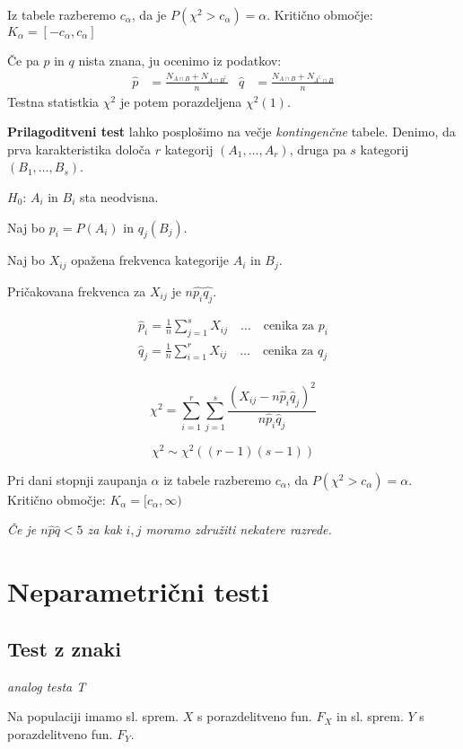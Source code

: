 \begin{multicols}{5}
Iz tabele razberemo $c_\alpha$, da je $P(\chi^2 > c_\alpha) = \alpha$. Kritično območje: $K_\alpha = [-c_\alpha, c_\alpha]$

Če pa $p$ in $q$ nista znana, ju ocenimo iz podatkov:
\begin{align*}
    \hat{p} &= \frac{N_{A\cap B} + N_{A \cap B^\complement}}{n} &
    \hat{q} &= \frac{N_{A\cap B} + N_{A^\complement \cap B}}{n}
\end{align*}
Testna statistkia $\chi^2$ je potem porazdeljena $\chi^2(1)$.

\textbf{Prilagoditveni test} lahko posplošimo na večje \textit{kontingenčne} tabele. 
Denimo, da prva karakteristika določa $r$ kategorij $(A_1, \dots, A_r)$, druga pa $s$ kategorij $(B_1, \dots, B_s)$.

$H_0$: $A_i$ in $B_i$ sta neodvisna.

Naj bo $p_i = P(A_i)$ in $q_j(B_j)$.

Naj bo $X_{ij}$ opažena frekvenca kategorije $A_i$ in $B_j$.

Pričakovana frekvenca za $X_{ij}$ je $n\hat{p_i} \hat{q_j}$.

\begin{align*}
    \hat{p}_i = \frac{1}{n} \sum_{j=1}^s X_{ij} \quad \dots \quad \text{cenika za } p_i \\
    \hat{q}_j = \frac{1}{n} \sum_{i=1}^r X_{ij} \quad \dots \quad \text{cenika za } q_j \\
\end{align*}

\[ \chi^2 = \sum_{i=1}^r \sum_{j=1}^s \frac{(X_{ij} - n\hat{p}_i \hat{q}_j)^2}{n\hat{p}_i \hat{q}_j}\]

\[ \chi^2 \sim \chi^2((r-1)(s-1))\]

Pri dani stopnji zaupanja $\alpha$ iz tabele razberemo $c_\alpha$, da $P(\chi^2 > c_\alpha) = \alpha$. 
Kritično območje: $K_\alpha = [c_\alpha, \infty)$

\textit{Če je $n\hat{p}\hat{q} < 5$ za kak $i, j$ moramo združiti nekatere razrede.}

\section{Neparametrični testi}
\subsection{Test z znaki}
\textit{analog testa T}

Na populaciji imamo sl. sprem. $X$ s porazdelitveno fun. $F_X$ in sl. sprem. $Y$ s porazdelitveno fun. $F_Y$.


\end{multicols}
